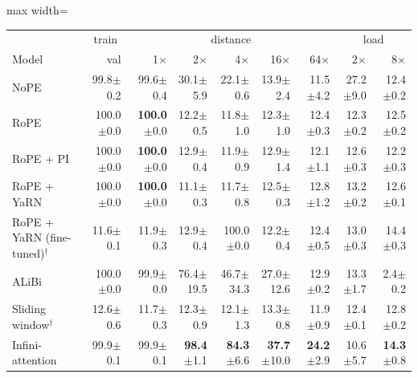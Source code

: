 \begin{table}\centering\small
\setlength{\tabcolsep}{4pt}
\begin{adjustbox}{max width=\linewidth}
\begin{tabular}{lrrrrrrrr}
\toprule
 & \multicolumn{1}{c}{train} & \multicolumn{5}{c}{distance} & \multicolumn{2}{c}{load} \\
Model & val & 1$\times$ & 2$\times$ & 4$\times$ & 16$\times$ & 64$\times$ & 2$\times$ & 8$\times$ \\
\midrule
NoPE & 99.8{\scriptsize$\pm$0.2} & 99.6{\scriptsize$\pm$0.4} & 30.1{\scriptsize$\pm$5.9} & 22.1{\scriptsize$\pm$0.6} & 13.9{\scriptsize$\pm$2.4} & 11.5{\scriptsize$\pm$4.2} & 27.2{\scriptsize$\pm$9.0} & 12.4{\scriptsize$\pm$0.2} \\
RoPE & 100.0{\scriptsize$\pm$0.0} & \textbf{100.0}{\scriptsize$\pm$0.0} & 12.2{\scriptsize$\pm$0.5} & 11.8{\scriptsize$\pm$1.0} & 12.3{\scriptsize$\pm$1.0} & 12.4{\scriptsize$\pm$0.3} & 12.3{\scriptsize$\pm$0.2} & 12.5{\scriptsize$\pm$0.2} \\
RoPE + PI & 100.0{\scriptsize$\pm$0.0} & \textbf{100.0}{\scriptsize$\pm$0.0} & 12.9{\scriptsize$\pm$0.4} & 11.9{\scriptsize$\pm$0.9} & 12.9{\scriptsize$\pm$1.4} & 12.1{\scriptsize$\pm$1.1} & 12.6{\scriptsize$\pm$0.3} & 12.2{\scriptsize$\pm$0.3} \\
RoPE + YaRN & 100.0{\scriptsize$\pm$0.0} & \textbf{100.0}{\scriptsize$\pm$0.0} & 11.1{\scriptsize$\pm$0.3} & 11.7{\scriptsize$\pm$0.8} & 12.5{\scriptsize$\pm$0.3} & 12.8{\scriptsize$\pm$1.2} & 13.2{\scriptsize$\pm$0.2} & 12.6{\scriptsize$\pm$0.1} \\
RoPE + YaRN (fine-tuned)$^\dagger$ & 11.6{\scriptsize$\pm$0.1} & 11.9{\scriptsize$\pm$0.3} & 12.9{\scriptsize$\pm$0.4} & 100.0{\scriptsize$\pm$0.0} & 12.2{\scriptsize$\pm$0.4} & 12.4{\scriptsize$\pm$0.5} & 13.0{\scriptsize$\pm$0.3} & 14.4{\scriptsize$\pm$0.3} \\
ALiBi & 100.0{\scriptsize$\pm$0.0} & 99.9{\scriptsize$\pm$0.0} & 76.4{\scriptsize$\pm$19.5} & 46.7{\scriptsize$\pm$34.3} & 27.0{\scriptsize$\pm$12.6} & 12.9{\scriptsize$\pm$0.2} & 13.3{\scriptsize$\pm$1.7} & 2.4{\scriptsize$\pm$0.2} \\
Sliding window$^\dagger$ & 12.6{\scriptsize$\pm$0.6} & 11.7{\scriptsize$\pm$0.3} & 12.3{\scriptsize$\pm$0.9} & 12.1{\scriptsize$\pm$1.3} & 13.3{\scriptsize$\pm$0.8} & 11.9{\scriptsize$\pm$0.9} & 12.4{\scriptsize$\pm$0.1} & 12.8{\scriptsize$\pm$0.2} \\
Infini-attention & 99.9{\scriptsize$\pm$0.1} & 99.9{\scriptsize$\pm$0.1} & \textbf{98.4}{\scriptsize$\pm$1.1} & \textbf{84.3}{\scriptsize$\pm$6.6} & \textbf{37.7}{\scriptsize$\pm$10.0} & \textbf{24.2}{\scriptsize$\pm$2.9} & 10.6{\scriptsize$\pm$5.7} & \textbf{14.3}{\scriptsize$\pm$0.8} \\

\end{tabular}
\end{adjustbox}
\end{table}
